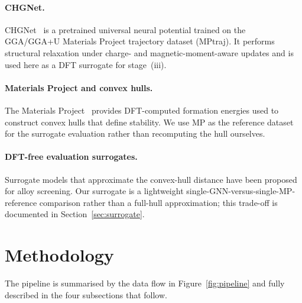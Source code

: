 \documentclass[11pt,a4paper]{article}
\begin{document}
\paragraph{CHGNet.}
CHGNet~\cite{cendrowski2024chgnet} is a pretrained universal neural
potential trained on the GGA/GGA+U Materials Project trajectory
dataset (MPtraj). It performs structural relaxation under
charge- and magnetic-moment-aware updates and is used here as a DFT
surrogate for stage~(iii).

\paragraph{Materials Project and convex hulls.}
The Materials Project~\cite{jain2013mp} provides DFT-computed formation
energies used to construct convex hulls that define stability. We use
MP as the reference dataset for the surrogate evaluation rather than
recomputing the hull ourselves.

\paragraph{DFT-free evaluation surrogates.}
Surrogate models that approximate the convex-hull distance have been
proposed for alloy screening. Our surrogate is a lightweight
single-GNN-versus-single-MP-reference comparison rather than a
full-hull approximation; this trade-off is documented in
Section~\ref{sec:surrogate}.

\section{Methodology}
\label{sec:method}

The pipeline is summarised by the data flow in
Figure~\ref{fig:pipeline} and fully described in the four subsections
that follow.
\end{document}
